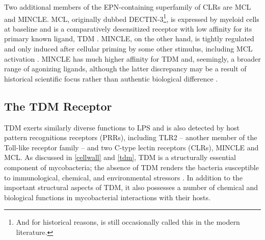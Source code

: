 Two additional members of the EPN-containing superfamily of CLRs are MCL and MINCLE. MCL, originally dubbed DECTIN-3\footnote{And for historical reasons, is still occasionally called this in the modern literature.}, is expressed by myeloid cells at baseline and is a comparatively desensitized receptor with low affinity for its primary known ligand, TDM \citep{Zhu2013, Miyake2013}. MINCLE, on the other hand, is tightly regulated and only induced after cellular priming by some other stimulus, including MCL activation \citep{Wells2008, Patin2017}. MINCLE has much higher affinity for TDM and, seemingly, a broader range of agonizing ligands, although the latter discrepancy may be a result of historical scientific focus rather than authentic biological difference \citep{Hansen2019, Richardson2014}.

\subsection{The TDM Receptor}\label{tdmreceptor}

TDM exerts similarly diverse functions to LPS and is also detected by host pattern recognitions receptors (PRRs), including TLR2 -- another member of the Toll-like receptor family -- and two C-type lectin receptors (CLRs), MINCLE and MCL. As discussed in \autoref{cellwall} and \autoref{tdm}, TDM is a structurally essential component of mycobacteria; the absence of TDM renders the bacteria susceptible to immunological, chemical, and environmental stressors \citep{Moliva2019, KanSutton2009, Rao2005}. In addition to the important structural aspects of TDM, it also possesses a number of chemical and biological functions in mycobacterial interactions with their hosts.

